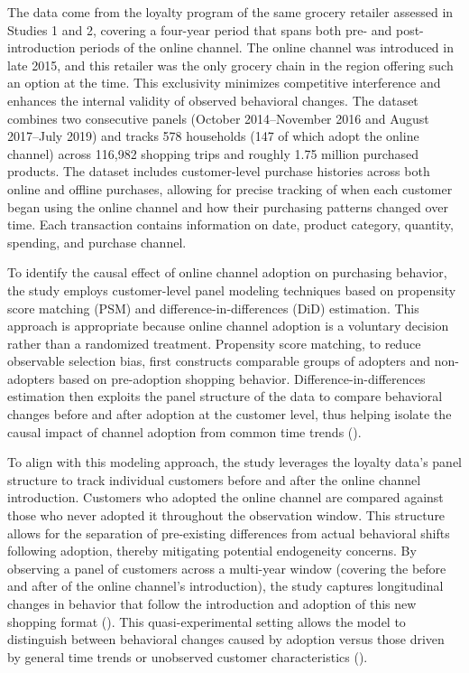 The data come from the loyalty program of the same grocery retailer assessed in Studies 1 and 2, covering a four-year period that spans both pre- and post-introduction periods of the online channel. The online channel was introduced in late 2015, and this retailer was the only grocery chain in the region offering such an option at the time. This exclusivity minimizes competitive interference and enhances the internal validity of observed behavioral changes. The dataset combines two consecutive panels (October 2014–November 2016 and August 2017–July 2019) and tracks 578 households (147 of which adopt the online channel) across 116,982 shopping trips and roughly 1.75 million purchased products. The dataset includes customer-level purchase histories across both online and offline purchases, allowing for precise tracking of when each customer began using the online channel and how their purchasing patterns changed over time. Each transaction contains information on date, product category, quantity, spending, and purchase channel.

To identify the causal effect of online channel adoption on purchasing behavior, the study employs customer-level panel modeling techniques based on propensity score matching (PSM) and difference-in-differences (DiD) estimation. This approach is appropriate because online channel adoption is a voluntary decision rather than a randomized treatment. Propensity score matching, to reduce observable selection bias, first constructs comparable groups of adopters and non-adopters based on pre-adoption shopping behavior. Difference-in-differences estimation then exploits the panel structure of the data to compare behavioral changes before and after adoption at the customer level, thus helping isolate the causal impact of channel adoption from common time trends (\cite{Boehm2008-it, Campo2015-pt}).

To align with this modeling approach, the study leverages the loyalty data’s panel structure to track individual customers before and after the online channel introduction. Customers who adopted the online channel are compared against those who never adopted it throughout the observation window. This structure allows for the separation of pre-existing differences from actual behavioral shifts following adoption, thereby mitigating potential endogeneity concerns. By observing a panel of customers across a multi-year window (covering the before and after of the online channel’s introduction), the study captures longitudinal changes in behavior that follow the introduction and adoption of this new shopping format (\cite{Avery2012-ex,Bilgicer2015-ng}). This quasi-experimental setting allows the model to distinguish between behavioral changes caused by adoption versus those driven by general time trends or unobserved customer characteristics (\cite{Li2015-tq}).

